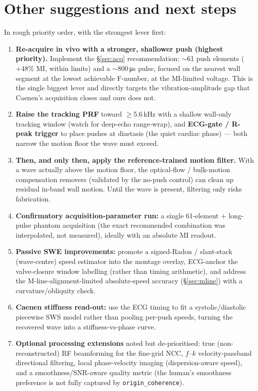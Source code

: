 \documentclass[11pt,a4paper]{article}
\begin{document}
\section{Other suggestions and next steps}\label{sec:next}
In rough priority order, with the strongest lever first:

\begin{enumerate}
  \item \textbf{Re-acquire in vivo with a stronger, shallower push (highest priority).} Implement the
  \S\ref{sec:acq} recommendation: $\sim$61 push elements ($+48\%$ MI, within limits) and a
  $\sim$800\,\si{\micro s} pulse, focused on the nearest wall segment at the lowest achievable F-number, at
  the MI-limited voltage. This is the single biggest lever and directly targets the vibration-amplitude gap
  that Caenen's acquisition closes and ours does not.
  \item \textbf{Raise the tracking PRF} toward $\geq$5.6\,kHz with a shallow wall-only tracking window
  (watch for deep-echo range-wrap), and \textbf{ECG-gate / R-peak trigger} to place pushes at diastasis
  (the quiet cardiac phase) --- both narrow the motion floor the wave must exceed.
  \item \textbf{Then, and only then, apply the reference-trained motion filter.} With a wave actually above
  the motion floor, the optical-flow / bulk-motion compensation removers (validated by the no-push control)
  can clean up residual in-band wall motion. Until the wave is present, filtering only risks fabrication.
  \item \textbf{Confirmatory acquisition-parameter run:} a single 61-element $+$ long-pulse phantom
  acquisition (the exact recommended combination was interpolated, not measured), ideally with an absolute
  MI readout.
  \item \textbf{Passive SWE improvements:} promote a signed-Radon / slant-stack (wave-centre) speed estimator
  into the montage overlay, ECG-anchor the valve-closure window labelling (rather than timing arithmetic),
  and address the M-line-alignment-limited absolute-speed accuracy (\S\ref{sec:mline}) with a
  curvature/obliquity check.
  \item \textbf{Caenen stiffness read-out:} use the ECG timing to fit a systolic/diastolic piecewise SWS
  model rather than pooling per-push speeds, turning the recovered wave into a stiffness-vs-phase curve.
  \item \textbf{Optional processing extensions} noted but de-prioritised: true (non-reconstructed) RF
  beamforming for the fine-grid NCC, $f$--$k$ velocity-passband directional filtering, local phase-velocity
  imaging (dispersion-aware speed), and a smoothness/SNR-aware quality metric (the human's smoothness
  preference is not fully captured by \texttt{origin\_coherence}).
\end{enumerate}
\end{document}
